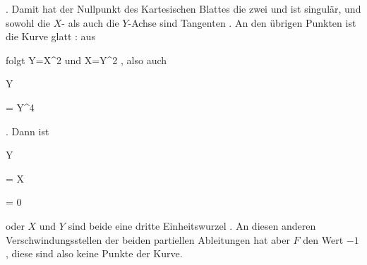 {{{   }{
}

}
{}{}{.}
Damit hat der Nullpunkt des Kartesischen Blattes die
zwei und ist singulär, und sowohl die $X$- als auch die $Y$-Achse sind Tangenten
 {} {.}
An den übrigen Punkten ist die Kurve glatt
 {} {:}
aus


 {  }


folgt
\mathkor {} {Y=X^2} {und} {X=Y^2} {,}
also auch


\mavergleichskette

{\vergleichskette

{Y
}

{ = }{ Y^4
}

{  }{
}

{    }{
}

{   }{
}

}
{}{}{}
 {} {.}
Dann ist


\mavergleichskette

{\vergleichskette

{Y
}

{ = }{ X
}

{ = }{ 0
}

{    }{
}

{   }{
}

}
{}{}{}
oder $X$ und $Y$ sind beide eine dritte Einheitswurzel
 {} {.}
An diesen anderen Verschwindungsstellen der beiden partiellen Ableitungen hat aber $F$ den Wert $-1$, diese sind also keine Punkte der Kurve.


}



{ }

